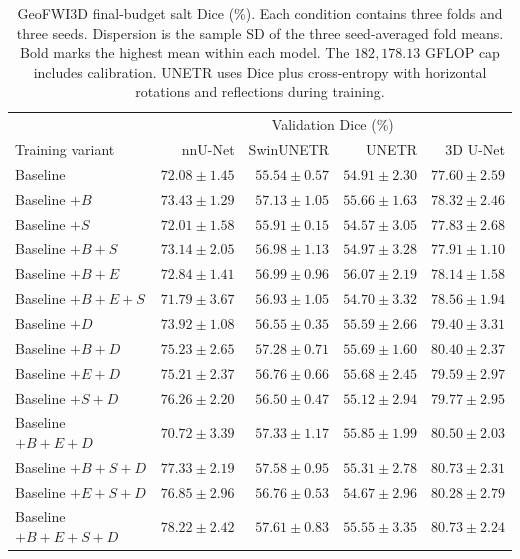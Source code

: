 \documentclass[12pt,a4paper]{article}
\begin{document}
\begin{table}[htbp]
\centering\small{}
\setlength{\tabcolsep}{5pt}
\renewcommand{\arraystretch}{1.15}
\begin{tabular}{@{}lrrrr@{}}
\hline
 & \multicolumn{4}{c}{Validation Dice (\%)} \\
Training variant & nnU-Net & SwinUNETR & UNETR & 3D U-Net \\
\hline
Baseline & $72.08\pm1.45$ & $55.54\pm0.57$ & $54.91\pm2.30$ & $77.60\pm2.59$ \\
Baseline $+B$ & $73.43\pm1.29$ & $57.13\pm1.05$ & $55.66\pm1.63$ & $78.32\pm2.46$ \\
Baseline $+S$ & $72.01\pm1.58$ & $55.91\pm0.15$ & $54.57\pm3.05$ & $77.83\pm2.68$ \\
Baseline $+B+S$ & $73.14\pm2.05$ & $56.98\pm1.13$ & $54.97\pm3.28$ & $77.91\pm1.10$ \\
Baseline $+B+E$ & $72.84\pm1.41$ & $56.99\pm0.96$ & $\mathbf{56.07\pm2.19}$ & $78.14\pm1.58$ \\
Baseline $+B+E+S$ & $71.79\pm3.67$ & $56.93\pm1.05$ & $54.70\pm3.32$ & $78.56\pm1.94$ \\
Baseline $+D$ & $73.92\pm1.08$ & $56.55\pm0.35$ & $55.59\pm2.66$ & $79.40\pm3.31$ \\
Baseline $+B+D$ & $75.23\pm2.65$ & $57.28\pm0.71$ & $55.69\pm1.60$ & $80.40\pm2.37$ \\
Baseline $+E+D$ & $75.21\pm2.37$ & $56.76\pm0.66$ & $55.68\pm2.45$ & $79.59\pm2.97$ \\
Baseline $+S+D$ & $76.26\pm2.20$ & $56.50\pm0.47$ & $55.12\pm2.94$ & $79.77\pm2.95$ \\
Baseline $+B+E+D$ & $70.72\pm3.39$ & $57.33\pm1.17$ & $55.85\pm1.99$ & $80.50\pm2.03$ \\
Baseline $+B+S+D$ & $77.33\pm2.19$ & $57.58\pm0.95$ & $55.31\pm2.78$ & $80.73\pm2.31$ \\
Baseline $+E+S+D$ & $76.85\pm2.96$ & $56.76\pm0.53$ & $54.67\pm2.96$ & $80.28\pm2.79$ \\
Baseline $+B+E+S+D$ & $\mathbf{78.22\pm2.42}$ & $\mathbf{57.61\pm0.83}$ & $55.55\pm3.35$ & $\mathbf{80.73\pm2.24}$ \\
\hline
\end{tabular}
\caption{GeoFWI3D final-budget salt Dice (\%). Each condition contains
three folds and three seeds. Dispersion is the sample SD of the three
seed-averaged fold means. Bold marks the highest mean within each model.
The $182{,}178.13$ GFLOP cap includes calibration. UNETR uses
Dice plus cross-entropy with horizontal rotations and reflections during
training.}
\label{tab:geo-matrix}
\end{table}
\end{document}
